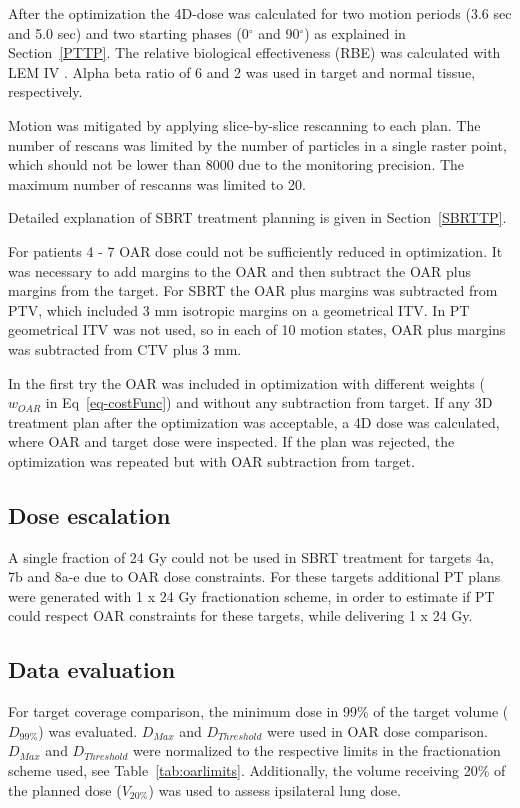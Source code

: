 After the optimization the 4D-dose was calculated for two motion periods (3.6 sec and 5.0 sec) and two starting phases (0$^\circ$ and 90$^\circ$) as explained in Section~\ref{PTTP}. 
The relative biological effectiveness (RBE) was calculated with LEM IV \cite{Elsaesser2010}. 
Alpha beta ratio of 6 and 2 was used in target and normal tissue, respectively.

Motion was mitigated by applying slice-by-slice rescanning to each plan. 
The number of rescans was limited by the number of particles in a single raster point, which should not be lower than 8000 due to the
monitoring precision. The maximum number of rescanns was limited to 20.

Detailed explanation of SBRT treatment planning is given in Section~\ref{SBRTTP}.

For patients 4 - 7 OAR dose could not be sufficiently reduced in optimization. It was necessary to add margins to the OAR and then 
subtract the OAR plus margins from the target. For SBRT the OAR plus margins was subtracted from PTV, which included 3 mm isotropic margins on a geometrical ITV. 
In PT geometrical ITV was not used, so in each of 10 motion states, OAR plus margins was subtracted from CTV plus 3 mm. 

In the first try the OAR was included in optimization with different weights ($w_{OAR}$ in Eq~\ref{eq-costFunc}) and without any subtraction from target. 
If any 3D treatment plan after the optimization was acceptable, a 4D dose was calculated, 
where OAR and target dose were inspected. If the plan was rejected, the optimization was repeated but with OAR subtraction from target. 



\subsection{Dose escalation}

A single fraction of 24 Gy could not be used in SBRT treatment for targets 4a, 7b and 8a-e due to OAR dose constraints. For these targets additional 
PT plans were generated with 1 x 24 Gy fractionation scheme, in order
to estimate if PT could respect OAR constraints for these targets, while delivering 1 x 24 Gy. 

\subsection{Data evaluation}

For target coverage comparison, the minimum dose in 99\% of the target volume ($D_{99\%}$) was evaluated. $D_{Max}$ and $D_{Threshold}$ were used in OAR dose comparison. $D_{Max}$ and $D_{Threshold}$ were normalized to the respective limits
in the fractionation scheme used, see Table~\ref{tab:oarlimits}. Additionally, the volume receiving 20\% of the planned dose ($V_{20\%}$) was used to assess ipsilateral lung dose.

